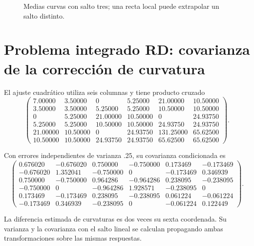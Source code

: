 \documentclass[11pt,a4paper]{article}
\begin{document}
\begin{figure}[H]\centering
{}
\caption{Medias curvas con salto tres; una recta local puede extrapolar un salto distinto.}
\end{figure}

\clearpage
\section{Problema integrado RD: covarianza de la corrección de curvatura}\label{unidad169}
El ajuste cuadrático utiliza seis
columnas y tiene producto cruzado
\[
\begin{pmatrix}7.00000&3.50000&0&5.25000&21.00000&10.50000\\3.50000&3.50000&5.25000&5.25000&10.50000&10.50000\\0&5.25000&21.00000&10.50000&0&24.93750\\5.25000&5.25000&10.50000&10.50000&24.93750&24.93750\\21.00000&10.50000&0&24.93750&131.25000&65.62500\\10.50000&10.50000&24.93750&24.93750&65.62500&65.62500\end{pmatrix}.
\]

Con errores independientes de varianza .25,
su covarianza condicionada es
\[
\begin{pmatrix}0.676020&-0.676020&0.750000&-0.750000&0.173469&-0.173469\\-0.676020&1.352041&-0.750000&0&-0.173469&0.346939\\0.750000&-0.750000&0.964286&-0.964286&0.238095&-0.238095\\-0.750000&0&-0.964286&1.928571&-0.238095&0\\0.173469&-0.173469&0.238095&-0.238095&0.061224&-0.061224\\-0.173469&0.346939&-0.238095&0&-0.061224&0.122449\end{pmatrix}.
\]

La diferencia estimada de curvaturas
es dos veces su sexta coordenada.
Su varianza y la covarianza con
el salto lineal se calculan
propagando ambas transformaciones
sobre las mismas respuestas.
\end{document}
